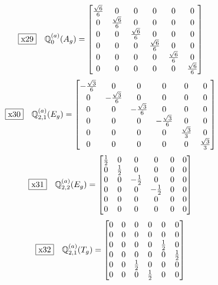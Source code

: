 \documentclass[fleqn,10pt,landscape]{jsarticle}
\begin{document}
\begin{dmath*}
\fbox{x29}\quad \mathbb{Q}_{0}^{(a)}(A_{g})=\begin{bmatrix} \frac{\sqrt{6}}{6} & 0 & 0 & 0 & 0 & 0 \\ 0 & \frac{\sqrt{6}}{6} & 0 & 0 & 0 & 0 \\ 0 & 0 & \frac{\sqrt{6}}{6} & 0 & 0 & 0 \\ 0 & 0 & 0 & \frac{\sqrt{6}}{6} & 0 & 0 \\ 0 & 0 & 0 & 0 & \frac{\sqrt{6}}{6} & 0 \\ 0 & 0 & 0 & 0 & 0 & \frac{\sqrt{6}}{6} \end{bmatrix}
\end{dmath*}
\begin{dmath*}
\fbox{x30}\quad \mathbb{Q}_{2,1}^{(a)}(E_{g})=\begin{bmatrix} - \frac{\sqrt{3}}{6} & 0 & 0 & 0 & 0 & 0 \\ 0 & - \frac{\sqrt{3}}{6} & 0 & 0 & 0 & 0 \\ 0 & 0 & - \frac{\sqrt{3}}{6} & 0 & 0 & 0 \\ 0 & 0 & 0 & - \frac{\sqrt{3}}{6} & 0 & 0 \\ 0 & 0 & 0 & 0 & \frac{\sqrt{3}}{3} & 0 \\ 0 & 0 & 0 & 0 & 0 & \frac{\sqrt{3}}{3} \end{bmatrix}
\end{dmath*}
\begin{dmath*}
\fbox{x31}\quad \mathbb{Q}_{2,2}^{(a)}(E_{g})=\begin{bmatrix} \frac{1}{2} & 0 & 0 & 0 & 0 & 0 \\ 0 & \frac{1}{2} & 0 & 0 & 0 & 0 \\ 0 & 0 & - \frac{1}{2} & 0 & 0 & 0 \\ 0 & 0 & 0 & - \frac{1}{2} & 0 & 0 \\ 0 & 0 & 0 & 0 & 0 & 0 \\ 0 & 0 & 0 & 0 & 0 & 0 \end{bmatrix}
\end{dmath*}
\begin{dmath*}
\fbox{x32}\quad \mathbb{Q}_{2,1}^{(a)}(T_{g})=\begin{bmatrix} 0 & 0 & 0 & 0 & 0 & 0 \\ 0 & 0 & 0 & 0 & 0 & 0 \\ 0 & 0 & 0 & 0 & \frac{1}{2} & 0 \\ 0 & 0 & 0 & 0 & 0 & \frac{1}{2} \\ 0 & 0 & \frac{1}{2} & 0 & 0 & 0 \\ 0 & 0 & 0 & \frac{1}{2} & 0 & 0 \end{bmatrix}
\end{dmath*}
\end{document}
